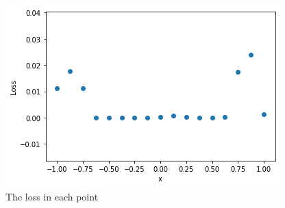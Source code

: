 \documentclass[11pt]{amsart}
\begin{document}
\begin{figure}[ht]
 
\centering
\includegraphics[scale=0.5]{local_minimum.jpg}
\caption{The loss in each point}
\label{figl}
 
\end{figure}
\end{document}
